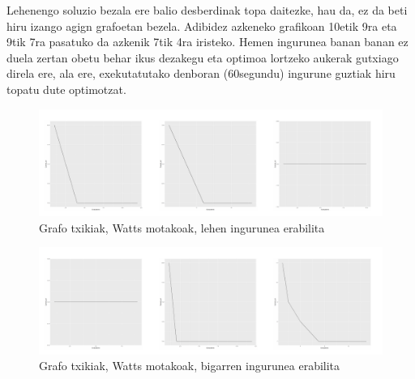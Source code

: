 \documentclass[eu,gi]{ifirak}\usepackage[]{graphicx}\usepackage[]{color}
\makeatletter
\def\maxwidth{ %
  \ifdim\Gin@nat@width>\linewidth
    \linewidth
  \else
    \Gin@nat@width
  \fi
}
\newenvironment{knitrout}{}{} %
\makeatother
\begin{document}
	Lehenengo soluzio bezala ere balio desberdinak topa daitezke, hau da, ez da beti hiru izango agign grafoetan bezela. Adibidez azkeneko grafikoan 10etik 9ra eta 9tik 7ra pasatuko da azkenik 7tik 4ra iristeko. Hemen ingurunea banan banan ez duela zertan obetu behar ikus dezakegu eta optimoa lortzeko aukerak gutxiago direla ere, ala ere, exekutatutako denboran (60segundu) ingurune guztiak hiru topatu dute optimotzat.\\
	
\begin{center}	
\begin{knitrout}
\color{fgcolor}\begin{figure}[!h]
\includegraphics[width=\maxwidth]{figure/unnamed-chunk-7-1} \caption[Grafo txikiak, Watts motakoak, lehen ingurunea erabilita]{Grafo txikiak, Watts motakoak, lehen ingurunea erabilita}\label{fig:unnamed-chunk-7}
\end{figure}


\end{knitrout}
\end{center}

\begin{center}	
\begin{knitrout}
\color{fgcolor}\begin{figure}[!h]
\includegraphics[width=\maxwidth]{figure/unnamed-chunk-8-1} \caption[Grafo txikiak, Watts motakoak, bigarren ingurunea erabilita]{Grafo txikiak, Watts motakoak, bigarren ingurunea erabilita}\label{fig:unnamed-chunk-8}
\end{figure}


\end{knitrout}
\end{center}
\end{document}
